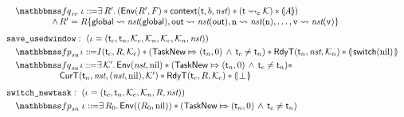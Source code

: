 \begin{figure}[!t]
\[\begin{array}{l}
            \\[-9pt]
            \quad
            \relspecpost_{\textit{rr}} \ \lgvl \define \exists \, \RFile'. \,  (\Env{\RFile', \Wstack}
            \sepstar \relcontext{\thrdid}{\block}{\nst} \sepstar 
            (\astCurCont{\thrdid}{\hthrdlocalst}) \sepstar \safePrimAst{\primcom}
            )  \\
            \hspace*{5em}
            \, \land \, 
            \RFile' = \RFile\{ \globalRN \rightsquigarrow \nst(\globalRN), 
                \outRN \rightsquigarrow \nst(\outRN), \regn \rightsquigarrow \nst(\regn), 
                \dots, \regv \rightsquigarrow \nst(\regv) \} \\
            \\[-5pt]
            \texttt{save\_usedwindow}: \ 
            (\lgvl = (\thrdid_c, \thrdid_n, \hthrdlocalst_c, \hthrdlocalst_n, 
                \hthrdlocalst_c, \hthrdlocalst_n, \nst)) \\
            \\[-9pt]
            \quad
            \relspecpre_{\textit{su}} \, \lgvl \define 
            I(\thrdid_c, \RFile, \hthrdlocalst_c) \sepstar 
            (\relmsto{\TaskNew}{(\thrdid_n, 0)} \, \land \, \thrdid_c \neq \thrdid_n) 
            \sepstar
            \RelRdyT{\thrdid_n}{\nst}{\hthrdlocalst_n} \sepstar 
            \safePrimAst{\, \primsw(\nil) \,} \\
            \\[-9pt]
            \quad
            \relspecpost_{\textit{su}} \, \lgvl \define 
            \exists \, \hthrdlocalst'. \, 
            \Env{\nst, \nil} \sepstar 
            (\relmsto{\TaskNew}{(\thrdid_n, 0)} \, \land \, \thrdid_c \neq \thrdid_n) \sepstar \\
            \hspace*{6em}
            \RelCurT{\thrdid_n}{\nst}{(\nst, \nil)}{\hthrdlocalst'} 
            \sepstar \RelRdyT{\thrdid_c}{\RFile}{\hthrdlocalst_c}
            \sepstar \safePrimAst{\, \primdone \,}
            \\
            \\[-5pt]
            \texttt{switch\_newtask}: \ (\lgvl = (\thrdid_c, \thrdid_n, \hthrdlocalst_c, 
            \hthrdlocalst_n, \RFile, \nst)) \\
            \\[-9pt]
            \quad 
            \relspecpre_{\textit{sn}} \ \lgvl \define 
            \exists \, \RFile_0. \, \Env{(\RFile_0, \nil)} \sepstar 
            (\relmsto{\TaskNew}{(\thrdid_n, 0)} \, \land \, \thrdid_c \neq \thrdid_n)

\end{array}\]
\end{figure}
